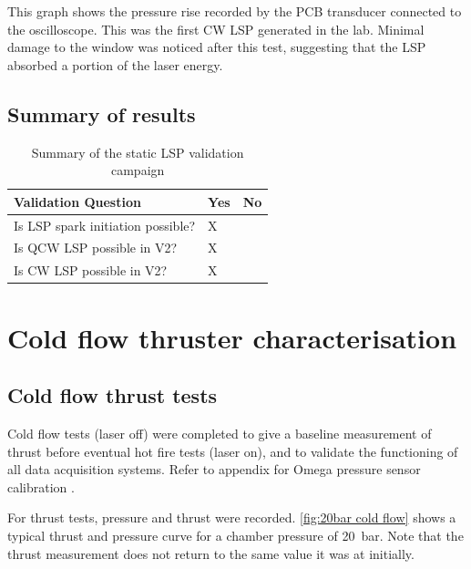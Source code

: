             This graph shows the pressure rise recorded by the PCB transducer connected to the oscilloscope. This was the first CW LSP generated in the lab.  Minimal damage to the window was noticed after this test, suggesting that the LSP absorbed a portion of the laser energy.

        \subsection{Summary of results}

            \begin{table}[!ht]
                \centering
                \caption{Summary of the static LSP validation campaign}
                \label{tab:validation}
                \begin{tabular}{@{}lll@{}}
                \toprule
                Validation Question               & Yes & No \\ \midrule
                Is LSP spark initiation possible? & X   &    \\
                Is QCW LSP possible in V2?        & X   &    \\
                Is CW LSP possible in V2?         & X   &   
                \end{tabular}
            \end{table}


    \section{Cold flow thruster characterisation}

        \subsection{Cold flow thrust tests}

            Cold flow tests (laser off) were completed to give a baseline measurement of thrust before eventual hot fire tests (laser on), and to validate the functioning of all data acquisition systems. Refer to appendix for Omega pressure sensor calibration .

            For thrust tests, pressure and thrust were recorded. \autoref{fig:20bar cold flow} shows a typical thrust and pressure curve for a chamber pressure of \qty{20}{bar}. Note that the thrust measurement does not return to the same value it was at initially.

